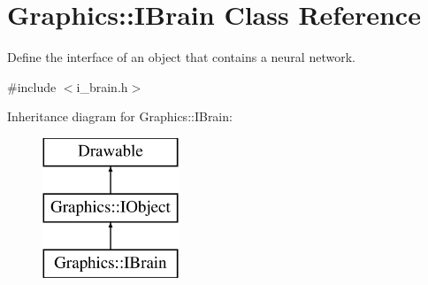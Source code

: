 \section{Graphics\+:\+:I\+Brain Class Reference}
\label{class_graphics_1_1_i_brain}


Define the interface of an object that contains a neural network.  




{\ttfamily \#include $<$i\+\_\+brain.\+h$>$}

Inheritance diagram for Graphics\+:\+:I\+Brain\+:\begin{figure}[H]
\begin{center}
\leavevmode
\includegraphics[height=4.188035cm]{class_graphics_1_1_i_brain}
\end{center}
\end{figure}
